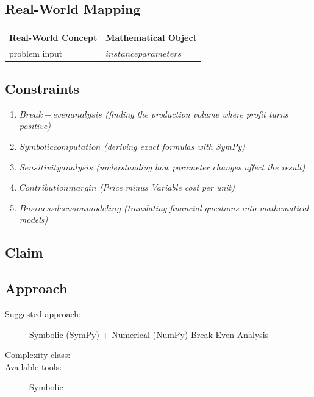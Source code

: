 \documentclass[11pt, a4paper]{article}
\begin{document}
\subsection{Real-World Mapping}

\begin{longtable}{ll}
\toprule
\textbf{Real-World Concept} & \textbf{Mathematical Object} \\
\midrule
\endhead
problem input & $instance parameters$ \\
\bottomrule
\end{longtable}

\subsection{Constraints}

\begin{enumerate}
  \item $Break-even analysis$
  \hfill \textit{(finding the production volume where profit turns positive)}
  \item $Symbolic computation$
  \hfill \textit{(deriving exact formulas with SymPy)}
  \item $Sensitivity analysis$
  \hfill \textit{(understanding how parameter changes affect the result)}
  \item $Contribution margin$
  \hfill \textit{(Price minus Variable cost per unit)}
  \item $Business decision modeling$
  \hfill \textit{(translating financial questions into mathematical models)}
\end{enumerate}

\subsection{Claim}


\subsection{Approach}

\begin{description}
  \item[Suggested approach:] Symbolic (SymPy) + Numerical (NumPy) Break-Even Analysis
  \item[Complexity class:] 
  \item[Available tools:] Symbolic
\end{description}
\end{document}

